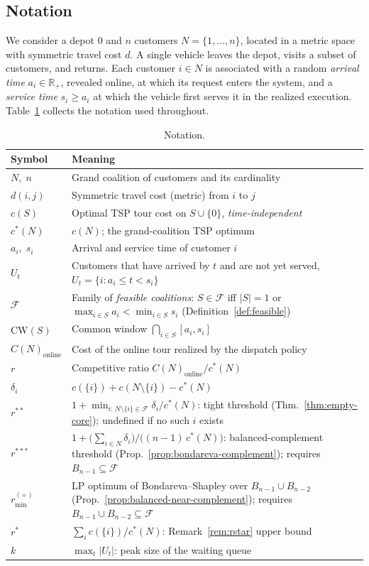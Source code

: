 \documentclass[11pt]{article}
\theoremstyle{plain}
\theoremstyle{definition}
\theoremstyle{remark}
\newcommand{\F}{\mathcal{F}}
\newcommand{\CW}{\mathrm{CW}}
\newcommand{\cstar}{c^{\ast}}
\begin{document}
\subsection{Notation}
We consider a depot $0$ and $n$ customers $N = \{1,\ldots,n\}$, located in a metric space with symmetric travel cost $d$. A single vehicle leaves the depot, visits a subset of customers, and returns. Each customer $i\in N$ is associated with a random \emph{arrival time} $a_i \in \mathbb{R}_+$, revealed online, at which its request enters the system, and a \emph{service time} $s_i \ge a_i$ at which the vehicle first serves it in the realized execution. Table~\ref{tab:notation} collects the notation used throughout.

\begin{table}[t]
\centering
\caption{Notation.}
\label{tab:notation}
\small
\begin{tabular}{@{}ll@{}}
\toprule
Symbol & Meaning \\
\midrule
$N,\; n$ & Grand coalition of customers and its cardinality \\
$d(i,j)$ & Symmetric travel cost (metric) from $i$ to $j$ \\
$c(S)$ & Optimal TSP tour cost on $S\cup\{0\}$, \emph{time-independent} \\
$\cstar(N)$ & $c(N)$; the grand-coalition TSP optimum \\
$a_i,\; s_i$ & Arrival and service time of customer $i$ \\
$U_t$ & Customers that have arrived by $t$ and are not yet served, $U_t=\{i:a_i\le t< s_i\}$ \\
$\F$ & Family of \emph{feasible coalitions}: $S\in\F$ iff $|S|=1$ or $\max_{i\in S} a_i < \min_{i\in S} s_i$ (Definition~\ref{def:feasible}) \\
$\CW(S)$ & Common window $\bigcap_{i\in S}[a_i, s_i]$ \\
$C(N)_{\text{online}}$ & Cost of the online tour realized by the dispatch policy \\
$r$ & Competitive ratio $C(N)_{\text{online}}/\cstar(N)$ \\
$\delta_i$ & $c(\{i\})+c(N\setminus\{i\})-\cstar(N)$ \\
$r^{\ast\ast}$ & $1+\min_{i:\,N\setminus\{i\}\in\F}\delta_i/\cstar(N)$: tight threshold (Thm.~\ref{thm:empty-core}); undefined if no such $i$ exists \\
$r^{\ast\ast\ast}$ & $1+\bigl(\sum_{i\in N}\delta_i\bigr)/\bigl((n-1)\,\cstar(N)\bigr)$: balanced-complement threshold (Prop.~\ref{prop:bondareva-complement}); requires $B_{n-1}\subseteq\F$ \\
$r^{(\diamond)}_{\min}$ & LP optimum of Bondareva--Shapley over $B_{n-1}\cup B_{n-2}$ (Prop.~\ref{prop:balanced-near-complement}); requires $B_{n-1}\cup B_{n-2}\subseteq\F$ \\
$r^{\ast}$ & $\sum_i c(\{i\})/\cstar(N)$: Remark~\ref{rem:rstar} upper bound \\
$k$ & $\max_t |U_t|$: peak size of the waiting queue \\
\bottomrule
\end{tabular}
\end{table}
\end{document}
